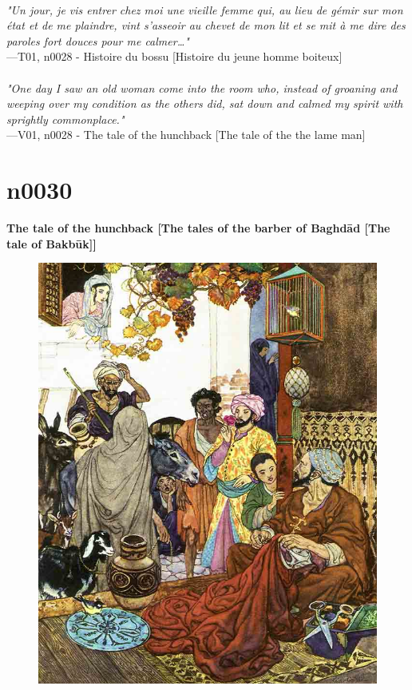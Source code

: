 \documentclass[../Carre_nights.tex]{subfiles}
\begin{document}
\textit{\\
"Un jour, je vis entrer chez moi une vieille femme qui, au lieu de gémir sur mon état et de me plaindre, vint s’asseoir au chevet de mon lit et se mit à me dire des paroles fort douces pour me calmer…"} \\
—T01, n0028 - Histoire du bossu [Histoire du jeune homme boiteux] \\~\\
\textit{"One day I saw an old woman come into the room who, instead of groaning and weeping over my condition as the others did, sat down and calmed my spirit with sprightly commonplace."} \\
—V01, n0028 - The tale of the hunchback [The tale of the the lame man]

\newpage

\section{n0030}
\textbf{\Large{The tale of the hunchback [The tales of the barber of Baghd\=ad [The tale of Bakb\=uk]]}} \\

\begin{figure}[ht]
\centering
\includegraphics[height=\figsize]{illustrations/volume_1/T01, n0030 - Histoire du bossu [Histoires du barbier de Baghdad [Histoire de Bacbouk]].jpg}
\end{figure}
\end{document}
